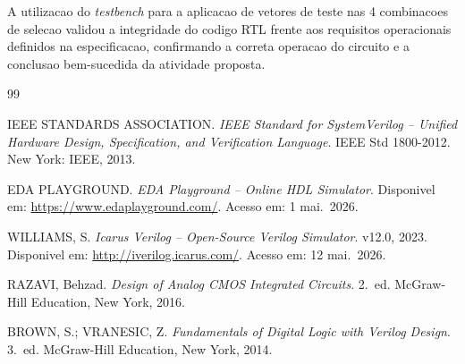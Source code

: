 \documentclass[12pt, a4paper]{article}
\begin{document}
A utilizacao do \textit{testbench} para a aplicacao de vetores de teste nas 4
combinacoes de selecao validou a integridade do codigo RTL frente aos requisitos
operacionais definidos na especificacao, confirmando a correta operacao do circuito
e a conclusao bem-sucedida da atividade proposta.

\renewcommand{\refname}{Referencias Bibliograficas}
\begin{thebibliography}{99}

IEEE STANDARDS ASSOCIATION.
\textit{IEEE Standard for SystemVerilog -- Unified Hardware Design, Specification,
and Verification Language}. IEEE Std 1800-2012. New York: IEEE, 2013.

EDA PLAYGROUND.
\textit{EDA Playground -- Online HDL Simulator}.
Disponivel em: \url{https://www.edaplayground.com/}.
Acesso em: 1 mai.\ 2026.

WILLIAMS, S.
\textit{Icarus Verilog -- Open-Source Verilog Simulator}. v12.0, 2023.
Disponivel em: \url{http://iverilog.icarus.com/}.
Acesso em: 12 mai.\ 2026.

RAZAVI, Behzad.
\textit{Design of Analog CMOS Integrated Circuits}. 2.~ed.
McGraw-Hill Education, New York, 2016.

BROWN, S.; VRANESIC, Z.
\textit{Fundamentals of Digital Logic with Verilog Design}. 3.~ed.
McGraw-Hill Education, New York, 2014.

\end{thebibliography}
\end{document}
